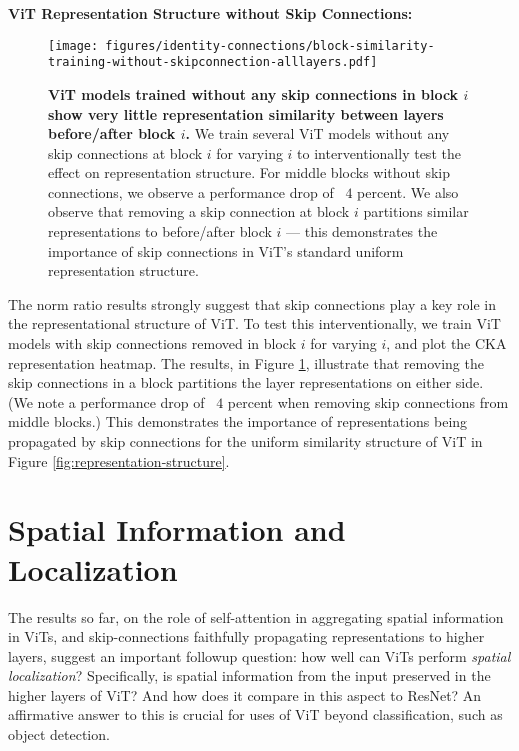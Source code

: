 \documentclass{article}
\begin{document}
\textbf{ViT Representation Structure without Skip Connections:}
\begin{figure}
    \centering
     \texttt{[image: figures/identity-connections/block-similarity-training-without-skipconnection-alllayers.pdf]}
    \caption{\small \textbf{ViT models trained without any skip connections in block $i$ show very little representation similarity between layers before/after block $i$.} We train several ViT models without any skip connections at block $i$ for varying $i$ to interventionally test the effect on representation structure. For middle blocks without skip connections, we observe a performance drop of ~$4$ percent. We also observe that removing a skip connection at block $i$ partitions similar representations to before/after block $i$ --- this demonstrates the importance of skip connections in ViT's standard uniform representation structure.}
    \label{fig:identity-connection-norms-cka}
    \vspace{-1.5em}
\end{figure}
The norm ratio results strongly suggest that skip connections play a key role in the representational structure of ViT. To test this interventionally, we train ViT models with skip connections removed in block $i$ for varying $i$, and plot the CKA representation heatmap. The results, in Figure \ref{fig:identity-connection-norms-cka}, illustrate that removing the skip connections in a block partitions the layer representations on either side. (We note a performance drop of ~$4$ percent when removing skip connections from middle blocks.) This demonstrates the importance of representations being propagated by skip connections for the uniform similarity structure of ViT in Figure \ref{fig:representation-structure}.

\section{Spatial Information and Localization}
\label{sec:spatial-localization}
The results so far, on the role of self-attention in aggregating spatial information in ViTs, and skip-connections faithfully propagating representations to higher layers, suggest an important followup question: how well can ViTs perform \textit{spatial localization}? Specifically, is spatial information from the input preserved in the higher layers of ViT? And how does it compare in this aspect to ResNet? An affirmative answer to this is crucial for uses of ViT beyond classification, such as object detection.
\end{document}
